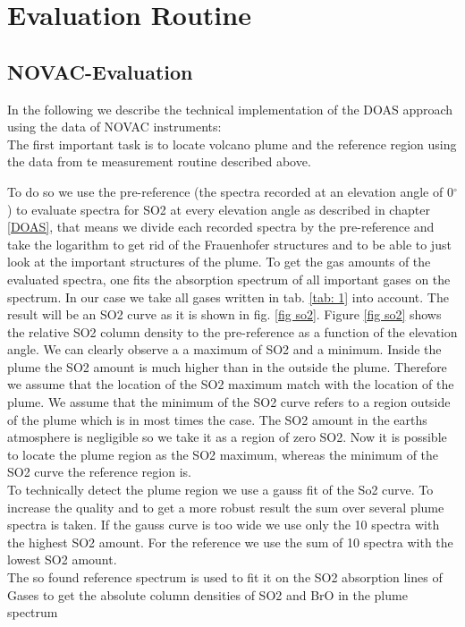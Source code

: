 \documentclass  [
  paper    = a4,
  BCOR     = 10mm,
  twoside,
  fontsize = 12pt,
  fleqn,
  toc      = bibnumbered,
  toc      = listofnumbered,
  numbers  = noendperiod,
  headings = normal,
  listof   = leveldown,
  version  = 3.03
]                                       {scrreprt}
\begin{document}
	\chapter{Evaluation Routine}
	\section{NOVAC-Evaluation}
	In the following we describe the technical implementation of the DOAS approach using the data of NOVAC instruments:\\
	The first important task is to locate volcano plume and the reference region using the data from te measurement routine described above.
	
	To do so we use the pre-reference (the spectra recorded at an elevation angle of  0$^{\circ} $) to evaluate spectra for SO2 at every elevation angle as described in chapter \ref{DOAS}, that means we divide each recorded spectra by the pre-reference and take the logarithm  to get rid of the Frauenhofer structures and to be able to just look at the important structures of the plume. To get the gas amounts of the evaluated spectra, one fits the absorption spectrum of all important gases on the spectrum. In our case we take all gases written in tab. \ref{tab: 1} into account. The result will be an SO2 curve as it is shown in fig. \ref{fig so2}.
	Figure \ref{fig so2} shows the relative SO2 column density to the pre-reference as a function of the elevation angle. We can clearly observe a a maximum of SO2 and a minimum. Inside the plume the SO2 amount is much higher than in the outside the plume. Therefore we assume that the location of the SO2 maximum match with the location of the plume. We assume that the minimum of the SO2 curve refers to a region outside of the plume which is in most times the case. The SO2 amount in the earths atmosphere is negligible so we take it as a region of zero SO2. Now it is possible to locate the plume region as the SO2 maximum, whereas the minimum of the SO2 curve the reference region is. \\
	To technically detect the plume region we use a gauss fit of the So2 curve.
	To increase the quality and to get a more robust result the sum over several plume spectra is taken. If the gauss curve is too wide we use only the 10 spectra with the highest SO2 amount. For the reference we use the sum of 10 spectra with the lowest SO2 amount.\\
	The so found reference spectrum is used to fit it on the SO2 absorption lines of Gases to get the absolute column densities of SO2 and BrO in the plume spectrum\\
\end{document}

